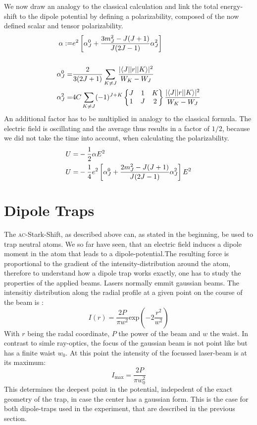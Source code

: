 We now draw an analogy to the classical calculation and link the total energy-shift to the dipole potential by defining a polarizability, composed of the now defined scalar and tensor polarizability.
\begin{align}
\alpha:=&e^2\left[\alpha^0_J+\frac{3m^2_J-J(J+1)}{J(2J-1)}\alpha^2_J\right]\\
\notag\\
\alpha^0_J=&\frac{2}{3(2J+1)}\sum_{K\neq J}\frac{|\langle J| |r| | K\rangle|^2}{W_K-W_J}\\
\alpha^2_J=&4C\sum_{K\neq J}(-1)^{J+K}\begin{Bmatrix}J&1&K\\1&J&2\end{Bmatrix}\frac{|\langle J| |r| | K\rangle|^2}{W_K-W_J}
\end{align}
An additional factor has to be multiplied in analogy to the classical formula. The electric field is oscillating and the average thus results in a factor of $1/2$, because we did not take the time into account, when calculating the polarizability.
\begin{align}
U=&-\frac{1}{2}\alpha E^2\notag\\
U=&-\frac{1}{4}e^2\left[\alpha^0_J+\frac{2m^2_J-J(J+1)}{J(2J-1)}\alpha^2_J\right]E^2\label{shift}
\end{align}

\section{Dipole Traps}

The \textsc{ac}-Stark-Shift, as described above can, as stated in the beginning, be used to trap neutral atoms. We so far have seen, that an electric field induces a dipole moment in the atom that leads to a dipole-potential.The resulting force is proportional to the gradient of the intensity-distribution around the atom, therefore to understand how a dipole trap works exactly, one has to study the properties of the applied beams. Lasers normally emmit gaussian beams. The intensitiy distribution along the radial profile at a given point on the course of the beam is \cite{dipole}:
\begin{equation}
I(r)=\frac{2P}{\pi w^2}\mathrm{exp}(-2\frac{r^2}{w^2})
\end{equation}
With $r$ being the radal coordinate, $P$ the power of the beam and $w$ the waist. In contrast to simle ray-optics, the focus of the gaussian beam is not point like but has a finite waist $w_0$. At this point the intensity of the focussed laser-beam is at its maximum:
\begin{equation}
I_{\mathrm{max}}=\frac{2P}{\pi w^2_0}
\end{equation}
This determines the deepest point in the potential, indepedent of the exact geometry of the trap, in case the center has a gaussian form. This is the case for both dipole-traps used in the experiment, that are described in the previous section.